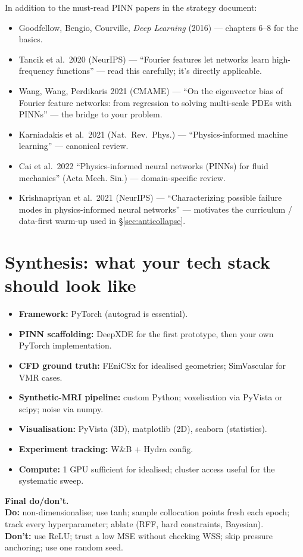 \documentclass[11pt]{article}
\begin{document}
In addition to the must-read PINN papers in the strategy document:
\begin{itemize}[noitemsep]
\item Goodfellow, Bengio, Courville, \emph{Deep Learning} (2016) --- chapters 6--8 for the basics.
\item Tancik et al.\ 2020 (NeurIPS) --- ``Fourier features let networks learn high-frequency functions'' --- read this carefully; it's directly applicable.
\item Wang, Wang, Perdikaris 2021 (CMAME) --- ``On the eigenvector bias of Fourier feature networks: from regression to solving multi-scale PDEs with PINNs'' --- the bridge to your problem.
\item Karniadakis et al.\ 2021 (Nat.\ Rev.\ Phys.) --- ``Physics-informed machine learning'' --- canonical review.
\item Cai et al.\ 2022 ``Physics-informed neural networks (PINNs) for fluid mechanics'' (Acta Mech. Sin.) --- domain-specific review.
\item Krishnapriyan et al.\ 2021 (NeurIPS) --- ``Characterizing possible failure modes in physics-informed neural networks'' --- motivates the curriculum / data-first warm-up used in \S\ref{sec:anticollapse}.
\end{itemize}

\section*{Synthesis: what your tech stack should look like}

\begin{itemize}[noitemsep]
\item \textbf{Framework:} PyTorch (autograd is essential).
\item \textbf{PINN scaffolding:} DeepXDE for the first prototype, then your own PyTorch implementation.
\item \textbf{CFD ground truth:} FEniCSx for idealised geometries; SimVascular for VMR cases.
\item \textbf{Synthetic-MRI pipeline:} custom Python; voxelisation via PyVista or scipy; noise via numpy.
\item \textbf{Visualisation:} PyVista (3D), matplotlib (2D), seaborn (statistics).
\item \textbf{Experiment tracking:} W\&B + Hydra config.
\item \textbf{Compute:} 1 GPU sufficient for idealised; cluster access useful for the systematic sweep.
\end{itemize}

\textbf{Final do/don't.}\\
\textbf{Do:} non-dimensionalise; use tanh; sample collocation points fresh each epoch; track every hyperparameter; ablate (RFF, hard constraints, Bayesian).\\
\textbf{Don't:} use ReLU; trust a low MSE without checking WSS; skip pressure anchoring; use one random seed.
\end{document}
